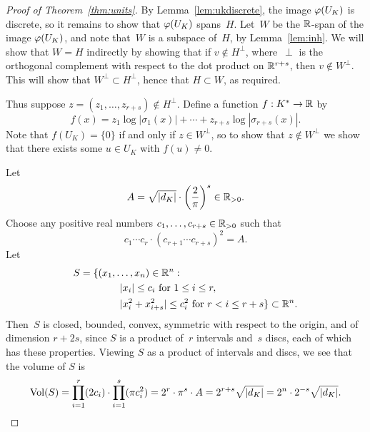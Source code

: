 \begin{proof}[Proof of Theorem~\ref{thm:units}]
By Lemma~\ref{lem:ukdiscrete}, the image $\varphi(U_K)$
is discrete, so it remains to show that $\varphi(U_K)$
spans~$H$.
Let~$W$ be the $\mathbb{R}$-span of the image
$\varphi(U_K)$, and note that~$W$ is a subspace of~$H$,
by Lemma~\ref{lem:inh}.  We will show
that $W=H$ indirectly by showing that if $v\not \in H^{\perp}$,
where~$\perp$ is the orthogonal complement
with respect to the dot product on $\mathbb{R}^{r+s}$, then
$v\not \in W^{\perp}$.  This will show that $W^{\perp}\subset
H^{\perp}$, hence that $H\subset W$, as required.

Thus suppose $z=(z_1,\ldots,z_{r+s})\not\in H^{\perp}$.
Define a function $f:K^*\to \mathbb{R}$ by
\begin{equation}\label{eqn:f}
  f(x) = z_1\log|\sigma_1(x)| + \cdots + z_{r+s}\log|\sigma_{r+s}(x)|.
\end{equation}
Note that $f(U_K)=\{0\}$ if and only if $z\in W^{\perp}$,
so to show that $z\not\in W^{\perp}$ we show that there exists some $u\in
U_K$ with $f(u)\neq 0$.

Let
$$
  A=\sqrt{|d_K|} \cdot \left( \frac{2}{\pi}\right)^s \in \mathbb{R}_{>0}.
$$
Choose any positive real numbers $c_1,\ldots, c_{r+s} \in \mathbb{R}_{>0}$
such that
$$
  c_1\cdots c_r\cdot (c_{r+1}\cdots c_{r+s})^2 = A.
$$
Let
\begin{align*}
  S &= \{(x_1,\ldots,x_n) \in \mathbb{R}^n : \\
    &\qquad\qquad |x_i|\leq c_i\text{ for } 1\leq i \leq r,\\
    &\qquad\qquad |x_i^2 + x_{i+s}^2| \leq c_i^2 \text{ for } r<i\leq r+s\} \subset \mathbb{R}^n.
\end{align*}
Then~$S$ is closed, bounded, convex, symmetric with respect to the
origin, and of dimension $r+2s$, since $S$ is a product of~$r$ intervals
and~$s$ discs, each of which has these properties.
Viewing $S$ as a product of intervals and discs, we see that the volume of $S$ is
$$
  \operatorname{Vol}(S) = \prod_{i=1}^r (2c_i) \cdot \prod_{i=1}^s (\pi c_i^2)
          = 2^r\cdot \pi^s \cdot A
  = 2^{r+s}\sqrt{|d_K|} = 2^n \cdot 2^{-s}\sqrt{|d_K|}.
$$


\end{proof}
